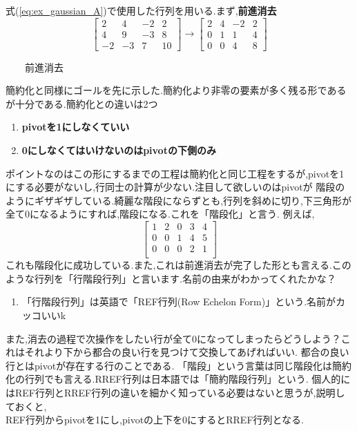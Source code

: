 式(\ref{eq:ex_gaussian_A})で使用した行列を用いる.まず,\textbf{前進消去}
\[
\begin{bmatrix}
    2& 4 & -2 & 2 \\
    4 & 9 & -3 & 8 \\
    -2 & -3 & 7 & 10
\end{bmatrix}
\rightarrow
\begin{bmatrix}
    2& 4 & -2 & 2 \\
    0 & 1 & 1 & 4 \\
    0 & 0 & 4 & 8
\end{bmatrix}
\]
\begin{center}
    　　前進消去
\end{center}
簡約化と同様にゴールを先に示した.簡約化より非零の要素が多く残る形であるが十分である.簡約化との違いは2つ
\begin{enumerate}
    \item \textbf{pivotを1にしなくていい}
    \item \textbf{0にしなくてはいけないのはpivotの下側のみ}
\end{enumerate}
ポイントなのはこの形にするまでの工程は簡約化と同じ工程をするが,pivotを1にする必要がないし,行同士の計算が少ない.注目して欲しいのはpivotが
階段のようにギザギザしている.綺麗な階段にならずとも,行列を斜めに切り,下三角形が全て0になるようにすれば,階段になる.これを「階段化」と言う.
例えば,
\[
\begin{bmatrix}
    1 & 2 & 0 & 3 & 4 \\
    0 & 0 & 1 & 4 & 5 \\
    0 & 0 & 0 & 2 & 1 \\
\end{bmatrix}
\]
これも階段化に成功している.また,これは前進消去が完了した形とも言える.このような行列を「行階段行列」と言います.名前の由来がわかってくれたかな？
\begin{enumerate}[label=※]
    \item「行階段行列」は英語で「REF行列(Row Echelon Form)」という.名前がカッコいいk
\end{enumerate}

また,消去の過程で次操作をしたい行が全て0になってしまったらどうしよう？これはそれより下から都合の良い行を見つけて交換してあげればいい.
都合の良い行とはpivotが存在する行のことである.
「階段」という言葉は同じ階段化は簡約化の行列でも言える.RREF行列は日本語では「簡約階段行列」という.
個人的にはREF行列とRREF行列の違いを細かく知っている必要はないと思うが,説明しておくと,\\
REF行列からpivotを1にし,pivotの上下を0にするとRREF行列となる.

